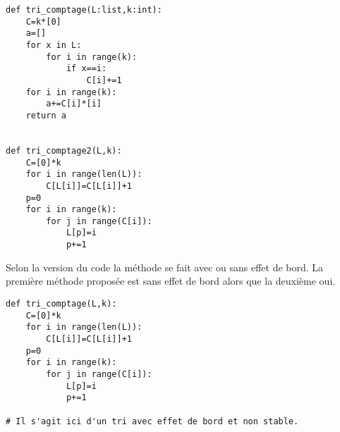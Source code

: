 


\begin{lstlisting}
def tri_comptage(L:list,k:int):
    C=k*[0]
    a=[]
    for x in L:
        for i in range(k):
            if x==i:
                C[i]+=1
    for i in range(k):
        a+=C[i]*[i]
    return a


def tri_comptage2(L,k):
    C=[0]*k
    for i in range(len(L)):
        C[L[i]]=C[L[i]]+1
    p=0
    for i in range(k):
        for j in range(C[i]):
            L[p]=i
            p+=1
\end{lstlisting}


Selon la version du code la méthode se fait avec ou sans effet de bord.
La première méthode proposée est sans effet de bord alors que la deuxième oui.


\ifprof
\begin{lstlisting}
def tri_comptage(L,k):
    C=[0]*k
    for i in range(len(L)):
        C[L[i]]=C[L[i]]+1
    p=0
    for i in range(k):
        for j in range(C[i]):
            L[p]=i
            p+=1
            
# Il s'agit ici d'un tri avec effet de bord et non stable. 
\end{lstlisting}
\else
\fi